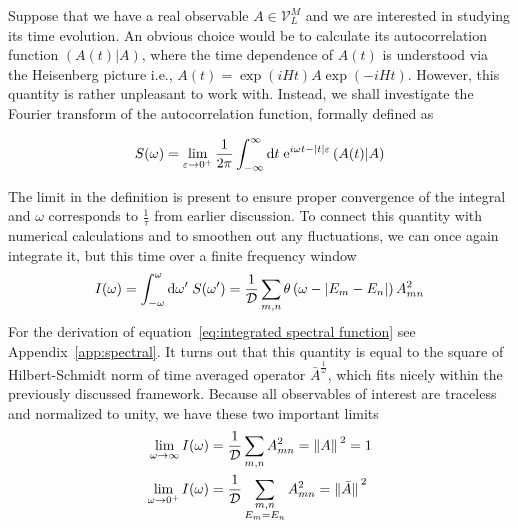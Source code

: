 Suppose that we have a real observable \(A \in \mathcal{V}_L^M\) and we are interested in studying its time
evolution. An obvious choice would be to calculate its autocorrelation function
\((A(t)|A)\), where the time dependence of \(A(t)\) is understood
via the Heisenberg picture i.e., \(A(t) = \exp\left(i H t\right) A
\exp\left(-i H t\right)\). However, this quantity is rather unpleasant to work with.
Instead, we shall investigate the Fourier transform of the autocorrelation function, formally
defined as
\begin{definition}  
  \begin{equation*}
  S(\omega) =  \lim _{\varepsilon \to 0^+} \frac{1}{2 \pi} \int_{-\infty}^{\infty} \mathrm{d} t 
  \; \mathrm{e}^{i \omega t-|t| \varepsilon}\left(A(t) \middle| A\right)
  \end{equation*}
  \label{def:spectral function}
\end{definition}
The limit in the definition is present to ensure proper convergence of the integral
and \(\omega{}\) corresponds to \(\frac{1}{\tau}\) from earlier discussion.
To connect this quantity with numerical calculations and to smoothen out any fluctuations, we
can once again integrate it, but this time over a finite frequency window
\begin{equation}
  I(\omega) = \int_{-\omega}^{\omega} \mathrm{d}\omega^{\prime} \; S(\omega^{\prime}) = 
  \frac{1}{\mathcal{D}} \sum_{m,n} \theta\left(\omega - |E_m-E_n|\right) A_{mn}^2
  \label{eq:integrated spectral function}
\end{equation}
For the derivation of equation~\eqref{eq:integrated spectral function} see Appendix~\ref{app:spectral}.
It turns out that this quantity is equal to the square of Hilbert-Schmidt norm of time
averaged operator \(\bar{A}^{\frac{1}{\omega}}\), which fits nicely within the previously
discussed framework. Because all observables of interest are traceless and
normalized to unity, we have these two important limits
\begin{align}
  \lim_{\omega \to \infty } I(\omega) &= \frac{1}{\mathcal{D}}\sum_{m,n} A_{mn}^2 = \norm*{A}^2 = 1\\
  \lim_{\omega \to 0^+ } I(\omega) &= \frac{1}{\mathcal{D}} \sum_{ \substack{m,n\\E_m=E_n} } A_{mn}^2 = \norm*{\bar{A}}^2
\end{align}

